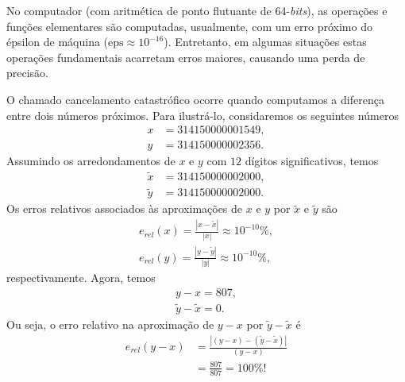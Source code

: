 No computador (com aritmética de ponto flutuante de 64-{\it bits}), as operações e funções elementares são computadas, usualmente, com um erro próximo do épsilon de máquina ($\mathrm{eps} \approx 10^{-16}$). Entretanto, em algumas situações estas operações fundamentais acarretam erros maiores, causando uma perda de precisão.

O chamado cancelamento catastrófico ocorre quando computamos a diferença entre dois números próximos. Para ilustrá-lo, considaremos os seguintes números
\begin{align}
  x &= 314150000001549,\\
  y &= 314150000002356.
\end{align}
Assumindo os arredondamentos de $x$ e $y$ com $12$ dígitos significativos, temos
\begin{align}
  \tilde{x} &= 314150000002000,\\
  \tilde{y} &= 314150000002000.
\end{align}
Os erros relativos associados às aproximações de $x$ e $y$ por $\tilde{x}$ e $\tilde{y}$ são
\begin{gather}
  e_{rel}(x) = \frac{|x-\tilde{x}|}{|x|} \approx 10^{-10}\%,\\
  e_{rel}(y) = \frac{|y-\tilde{y}|}{|y|} \approx 10^{-10}\%,
\end{gather}
respectivamente. Agora, temos
\begin{gather}
  y-x = 807,\\
  \tilde{y}-\tilde{x}=0.
\end{gather}
Ou seja, o erro relativo na aproximação de $y-x$ por $\tilde{y}-\tilde{x}$ é
\begin{align}
  e_{rel}(y-x) &= \frac{|(y-x)-(\tilde{y}-\tilde{x})|}{(y-x)}\\
               &= \frac{807}{807} = 100\%!
\end{align}

